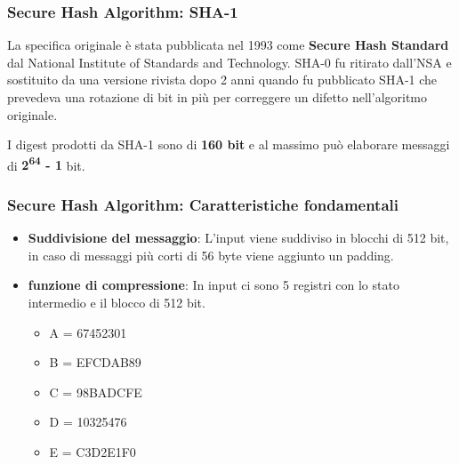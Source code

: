 \begin{frame}
	\frametitle{Secure Hash Algorithm: SHA-1}

	La specifica originale è stata pubblicata nel 1993 come \textbf{Secure Hash Standard} dal National Institute of Standards and Technology.
	SHA-0 fu ritirato dall'NSA e sostituito da una versione rivista dopo 2 anni quando fu pubblicato SHA-1 che prevedeva una rotazione di bit in più
	per correggere un difetto nell'algoritmo originale.

	\vspace{1cm}

	I digest prodotti da SHA-1 sono di \textbf{160 bit} e al massimo può elaborare messaggi di \textbf{2\textsuperscript{64} - 1} bit.
\end{frame}

\begin{frame}
	\frametitle{Secure Hash Algorithm: Caratteristiche fondamentali}
	\begin{itemize}
		\item \textbf{Suddivisione del messaggio}: L'input viene suddiviso in blocchi di 512 bit, in caso di messaggi
		      più corti di 56 byte viene aggiunto un padding.
		\item \textbf{funzione di compressione}: In input ci sono 5 registri con lo stato intermedio e il blocco di 512 bit.
		      \begin{itemize}
			      \item A = 67452301
			      \item B = EFCDAB89
			      \item C = 98BADCFE
			      \item D = 10325476
			      \item E = C3D2E1F0
		      \end{itemize}
	\end{itemize}
\end{frame}


